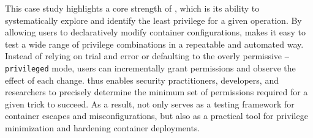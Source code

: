 This case study highlights a core strength of \houdini, which is its ability to systematically explore and identify the least privilege for a given operation. By allowing users to declaratively modify container configurations, \houdini makes it easy to test a wide range of privilege combinations in a repeatable and automated way. Instead of relying on trial and error or defaulting to the overly permissive \texttt{--privileged} mode, users can incrementally grant permissions and observe the effect of each change. \houdini thus enables security practitioners, developers, and researchers to precisely determine the minimum set of permissions required for a given trick to succeed. As a result, \houdini not only serves as a testing framework for container escapes and misconfigurations, but also as a practical tool for privilege minimization and hardening container deployments.





